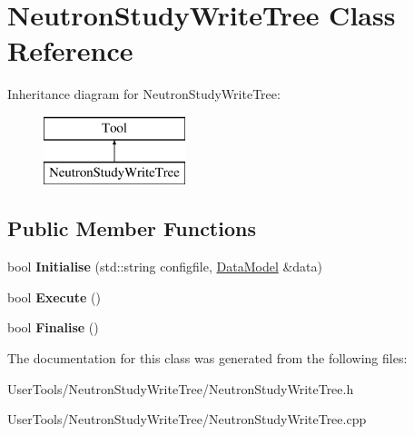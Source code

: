 \hypertarget{classNeutronStudyWriteTree}{\section{Neutron\-Study\-Write\-Tree Class Reference}
\label{classNeutronStudyWriteTree}
}
Inheritance diagram for Neutron\-Study\-Write\-Tree\-:\begin{figure}[H]
\begin{center}
\leavevmode
\includegraphics[height=2.000000cm]{classNeutronStudyWriteTree}
\end{center}
\end{figure}
\subsection*{Public Member Functions}
\begin{DoxyCompactItemize}
\item 
\hypertarget{classNeutronStudyWriteTree_a6fa5e7ec01a703b7589583e8c5af744d}{bool {\bfseries Initialise} (std\-::string configfile, \hyperlink{classDataModel}{Data\-Model} \&data)}\label{classNeutronStudyWriteTree_a6fa5e7ec01a703b7589583e8c5af744d}

\item 
\hypertarget{classNeutronStudyWriteTree_a9e89fb86ad252f39f5f173e0bd8f3528}{bool {\bfseries Execute} ()}\label{classNeutronStudyWriteTree_a9e89fb86ad252f39f5f173e0bd8f3528}

\item 
\hypertarget{classNeutronStudyWriteTree_ad11e2482834166c4630ddf4cd8fd6d38}{bool {\bfseries Finalise} ()}\label{classNeutronStudyWriteTree_ad11e2482834166c4630ddf4cd8fd6d38}

\end{DoxyCompactItemize}


The documentation for this class was generated from the following files\-:\begin{DoxyCompactItemize}
\item 
User\-Tools/\-Neutron\-Study\-Write\-Tree/Neutron\-Study\-Write\-Tree.\-h\item 
User\-Tools/\-Neutron\-Study\-Write\-Tree/Neutron\-Study\-Write\-Tree.\-cpp\end{DoxyCompactItemize}

